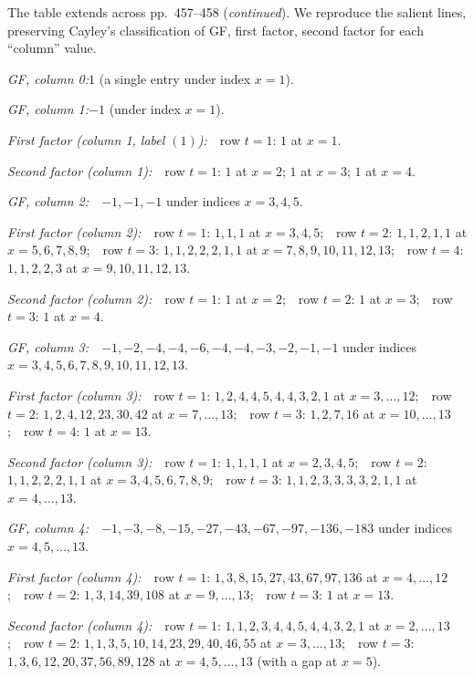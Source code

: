 \documentclass[11pt,a4paper]{article}
\begin{document}
\smallskip
\noindent The table extends across pp.~457--458 (\textit{continued}).   We reproduce the salient lines, preserving Cayley's classification of GF, first factor, second factor for each ``column'' value.

\medskip

\noindent\textit{GF, column 0:}\quad $1$ (a single entry under index $x=1$).

\noindent\textit{GF, column 1:}\quad $-1$ (under index $x=1$).

\noindent\textit{First factor (column 1, label $(1)$):}\ \ row $t=1$: $1$ at $x=1$.

\noindent\textit{Second factor (column 1):}\ \ row $t=1$: $1$ at $x=2$; $1$ at $x=3$; $1$ at $x=4$.

\medskip

\noindent\textit{GF, column 2:}\ \ $-1,-1,-1$ under indices $x=3,4,5$.

\noindent\textit{First factor (column 2):}\ \ row $t=1$: $1,1,1$ at $x=3,4,5$;\ \ row $t=2$: $1,1,2,1,1$ at $x=5,6,7,8,9$;\ \ row $t=3$: $1,1,2,2,2,1,1$ at $x=7,8,9,10,11,12,13$;\ \ row $t=4$: $1,1,2,2,3$ at $x=9,10,11,12,13$.

\noindent\textit{Second factor (column 2):}\ \ row $t=1$: $1$ at $x=2$;\ \ row $t=2$: $1$ at $x=3$;\ \ row $t=3$: $1$ at $x=4$.

\medskip

\noindent\textit{GF, column 3:}\ \ $-1,-2,-4,-4,-6,-4,-4,-3,-2,-1,-1$ under indices $x=3,4,5,6,7,8,9,10,11,12,13$.

\noindent\textit{First factor (column 3):}\ \ row $t=1$: $1,2,4,4,5,4,4,3,2,1$ at $x=3,\ldots,12$;\ \ row $t=2$: $1,2,4,12,23,30,42$ at $x=7,\ldots,13$;\ \ row $t=3$: $1,2,7,16$ at $x=10,\ldots,13$;\ \ row $t=4$: $1$ at $x=13$.

\noindent\textit{Second factor (column 3):}\ \ row $t=1$: $1,1,1,1$ at $x=2,3,4,5$;\ \ row $t=2$: $1,1,2,2,2,1,1$ at $x=3,4,5,6,7,8,9$;\ \ row $t=3$: $1,1,2,3,3,3,3,2,1,1$ at $x=4,\ldots,13$.

\medskip

\noindent\textit{GF, column 4:}\ \ $-1,-3,-8,-15,-27,-43,-67,-97,-136,-183$ under indices $x=4,5,\ldots,13$.

\noindent\textit{First factor (column 4):}\ \ row $t=1$: $1,3,8,15,27,43,67,97,136$ at $x=4,\ldots,12$;\ \ row $t=2$: $1,3,14,39,108$ at $x=9,\ldots,13$;\ \ row $t=3$: $1$ at $x=13$.

\noindent\textit{Second factor (column 4):}\ \ row $t=1$: $1,1,2,3,4,4,5,4,4,3,2,1$ at $x=2,\ldots,13$;\ \ row $t=2$: $1,1,3,5,10,14,23,29,40,46,55$ at $x=3,\ldots,13$;\ \ row $t=3$: $1,3,6,12,20,37,56,89,128$ at $x=4,5,\ldots,13$ (with a gap at $x=5$).
\end{document}
